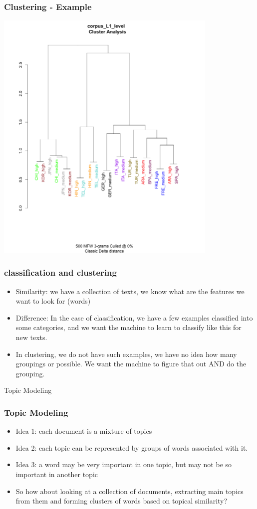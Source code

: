 \documentclass{beamer}
\begin{document}
\begin{frame}
\frametitle{Clustering - Example}
\includegraphics[width=0.8\textwidth,angle=-90]{clusteringexample.png}
\end{frame}

\begin{frame}
\frametitle{classification and clustering}
\begin{itemize}
\item Similarity: we have a collection of texts, we know what are the features we want to look for (words) \pause 
\item Difference: In the case of classification, we have a few examples classified into some categories, and we want the machine to learn to classify like this for new texts. \pause
\item In clustering, we do not have such examples, we have no idea how many groupings or possible. We want the machine to figure that out AND do the grouping. 
\end{itemize}
\end{frame}

\begin{frame}
\Large Topic Modeling
\end{frame}

\begin{frame}
\frametitle{Topic Modeling}
\begin{itemize}
\item Idea 1: each document is a mixture of topics
\item Idea 2: each topic can be represented by groups of words associated with it. \pause
\item Idea 3: a word may be very important in one topic, but may not be so important in another topic \pause
\item So how about looking at a collection of documents, extracting main topics from them and forming clusters of words based on topical similarity?
\end{itemize}
\end{frame}
\end{document}
